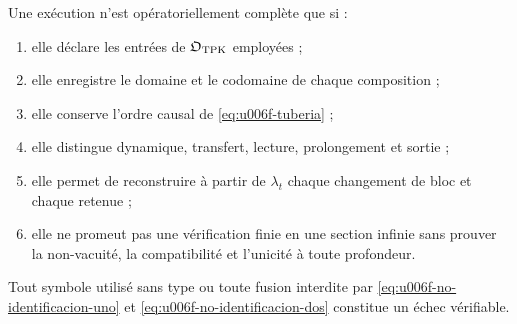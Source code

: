 \begin{criterion}
\label{crit:u006f-completitud}
Une exécution n’est opératoriellement complète que si :
\begin{enumerate}
 \item elle déclare les entrées de \(\mathfrak O_{\rm TPK}\) employées ;
 \item elle enregistre le domaine et le codomaine de chaque composition ;
 \item elle conserve l’ordre causal de \eqref{eq:u006f-tuberia} ;
 \item elle distingue dynamique, transfert, lecture, prolongement et sortie ;
 \item elle permet de reconstruire à partir de \(\lambda_t\) chaque changement de bloc et
 chaque retenue ;
 \item elle ne promeut pas une vérification finie en une section infinie sans
 prouver la non-vacuité, la compatibilité et l’unicité à toute profondeur.
\end{enumerate}
Tout symbole utilisé sans type ou toute fusion interdite par
\eqref{eq:u006f-no-identificacion-uno} et
\eqref{eq:u006f-no-identificacion-dos} constitue un échec vérifiable.
\end{criterion}
